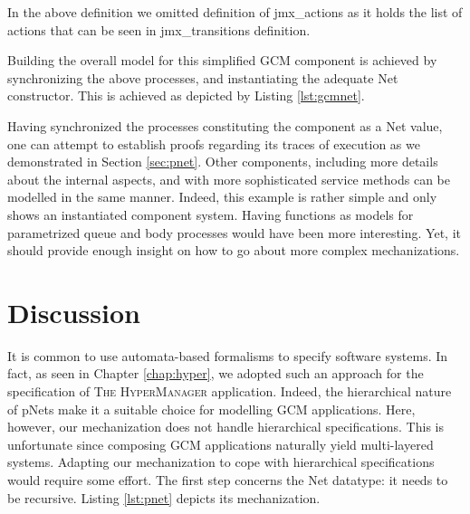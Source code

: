 		
	\noindent In the above definition we omitted definition of \textsf{jmx\_actions} as it
	holds the list of \textsf{actions} that can be seen in \textsf{jmx\_transitions} definition.
	
		Building the	overall model for this simplified \ac{GCM} component is achieved by synchronizing
		the above processes, and instantiating the adequate \textsf{Net} constructor. This is achieved
		as depicted by Listing \ref{lst:gcmnet}.
		
		
				
	
	
	
		Having synchronized the processes constituting the component as a \textsf{Net} value,
		one can attempt to establish proofs regarding its traces of execution as we demonstrated in
		Section \ref{sec:pnet}. Other components, including more details about the internal 
		aspects, and with more sophisticated service methods can be modelled
		in the same manner. Indeed, this example is rather simple and only shows
		an instantiated component system. Having functions as models for parametrized
		queue and body processes would have been more interesting.		
		Yet, it should provide enough insight on how to go about more complex
		mechanizations.



\section{Discussion}
\label{sec:behaviourdiscussion}
	
	
	It is common to use automata-based formalisms to specify software systems. In fact,		
	as seen in Chapter \ref{chap:hyper}, we adopted such an approach for the specification
	of \textsc{The HyperManager} application. Indeed, the hierarchical nature of pNets
	make it a suitable choice for modelling \ac{GCM} applications. Here, however,
	our mechanization does not handle hierarchical specifications. This is unfortunate
	since composing \ac{GCM} applications naturally yield multi-layered systems.
	Adapting our mechanization to cope with hierarchical specifications would
	require some effort. The first step concerns the \textsf{Net} datatype: it
	needs to be recursive. Listing \ref{lst:pnet} depicts its mechanization.
	
		
						

